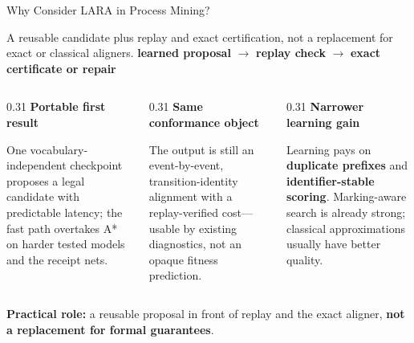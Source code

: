 \documentclass[aspectratio=169]{beamer}
\newcommand{\keyc}[1]{\textbf{\textcolor{larablue}{#1}}}
\newcommand{\keyg}[1]{\textbf{\textcolor{laraaqua!70!black}{#1}}}
\newcommand{\keya}[1]{\textbf{\textcolor{laraamber!85!black}{#1}}}
\begin{document}
\begin{frame}{Why Consider LARA in Process Mining?}
  \begin{block}{A reusable candidate plus replay and exact certification,
    not a replacement for exact or classical aligners.}
    \centering
    \keyc{learned proposal} $\longrightarrow$ \keyg{replay check}
    $\longrightarrow$ \keyg{exact certificate or repair}
  \end{block}
  \vspace{2mm}
  \begin{columns}[T]
  \begin{column}{0.31\textwidth}
    \centering \keyc{Portable first result}\par
    \vspace{1mm}\small
    One vocabulary-independent checkpoint proposes a legal candidate
    with predictable latency; the fast path overtakes A* on harder
    tested models and the receipt nets.
  \end{column}
  \begin{column}{0.31\textwidth}
    \centering \keyg{Same conformance object}\par
    \vspace{1mm}\small
    The output is still an event-by-event, transition-identity alignment with
    a replay-verified cost---usable by existing diagnostics, not an opaque
    fitness prediction.
  \end{column}
  \begin{column}{0.31\textwidth}
    \centering \keya{Narrower learning gain}\par
    \vspace{1mm}\small
    Learning pays on \keyc{duplicate prefixes} and
    \keyc{identifier-stable scoring}. Marking-aware search is already
    strong; classical approximations usually have better quality.
  \end{column}
  \end{columns}
  \vspace{4mm}
  \centering
  \textbf{Practical role:} a reusable proposal in front of replay and the
  exact aligner, \keya{not a replacement for formal guarantees}.
\end{frame}
\end{document}
